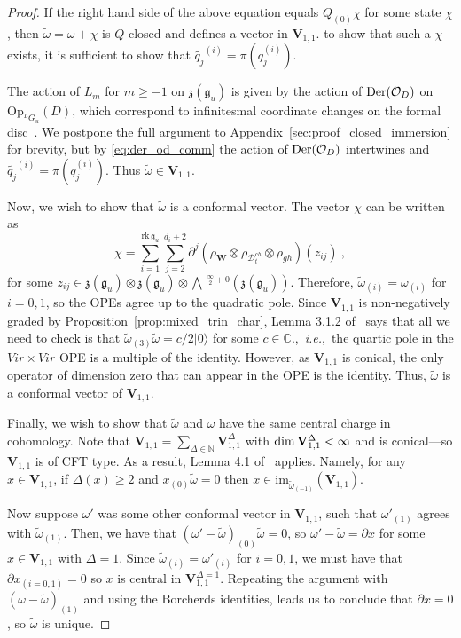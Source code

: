 \documentclass[a4paper]{article}
\def\IC{\mathbb{C}}
\def\IN{\mathbb{N}}
\def\OO{{\cal O}}
\newcommand{\ket}[1]{|{#1}\rangle}
\def\dim{{\rm dim}}
\def\gf{\mathfrak{g}}
\def \zf{\mathfrak{z}}
\def \ie{{\it i.e.}}
\newcommand{\Li}[1]{\mathrm{\bigwedge}\,^{\frac{\infty}{2}+#1}}
\def\D{\mathcal{D}^{ch}}
\def\W{\mathbf{W}}
\def\V{\mathbf{V}}
\begin{document}
\begin{proof}
If the right hand side of the above equation equals $Q_{(0)}\chi$ for some state $\chi$, then $\widetilde{\omega} = \omega + \chi$ is $Q$-closed and defines a vector in $\V_{1,1}$. to show that such a $\chi$ exists, it is sufficient to show that $\widetilde{q_j}^{(i)}= \pi(q_j^{(i)})$.

The action of $L_m$ for $m\geqslant -1$ on $\zf(\gf_u)$ is given by the action of $\mathrm{Der}(\OO_D)$ on $\mathrm{Op}_{^LG_u}(D)$, which correspond to infinitesmal coordinate changes on the formal disc~\cite{Frenkel:2007}. We postpone the full argument to Appendix~\ref{sec:proof_closed_immersion} for brevity, but by \eqref{eq:der_od_comm} the action of $\mathrm{Der}(\OO_D)$ intertwines and $\widetilde{q_j}^{(i)}= \pi(q_j^{(i)})$. Thus $\widetilde{\omega}\in \V_{1,1}$.

Now, we wish to show that $\widetilde{\omega}$ is a conformal vector. The vector $\chi$ can be written as
\begin{equation*}
	\chi = \sum_{i=1}^{\mathrm{rk}\, \gf_u}\sum_{j=2}^{d_i+2} \partial^j (\rho_{\W}\otimes \rho_{\D_t}\otimes \rho_{gh})(z_{ij})~,
\end{equation*}
for some $z_{ij} \in \zf(\gf_u)\otimes\zf(\gf_u)\otimes \Li{0}(\zf(\gf_u))$. Therefore, $\widetilde{\omega}_{(i)}=\omega_{(i)}$ for $i=0,1$, so the OPEs agree up to the quadratic pole. Since $\V_{1,1}$ is non-negatively graded by Proposition~\ref{prop:mixed_trin_char}, Lemma 3.1.2 of~\cite{Frenkel:2007} says that all we need to check is that $\widetilde{\omega}_{(3)}\widetilde{\omega}= c/2\ket{0}$ for some $c\in\IC$.,~\ie,~the quartic pole in the $Vir\times Vir$ OPE is a multiple of the identity. However, as $\V_{1,1}$ is conical, the only operator of dimension zero that can appear in the OPE is the identity. Thus, $\widetilde{\omega}$ is a conformal vector of $\V_{1,1}$.

Finally, we wish to show that $\widetilde{\omega}$ and $\omega$ have the same central charge in cohomology. Note that $\V_{1,1}=\sum_{\Delta\in\IN} \V_{1,1}^{\Delta}$ with $\dim\, \V_{1,1}^\Delta<\infty$ and is conical---so $\V_{1,1}$ is of CFT type. As a result, Lemma 4.1 of~\cite{Moriwaki_2020} applies. Namely, for any $x\in \V_{1,1}$, if $\Delta(x)\geqslant 2$ and $x_{(0)}\widetilde{\omega}=0$ then $x \in \mathrm{im}_{\widetilde{\omega}_{(-1)}}(\V_{1,1})$.

Now suppose $\omega'$ was some other conformal vector in $\V_{1,1}$, such that $\omega'_{(1)}$ agrees with $\widetilde{\omega}_{(1)}$. Then, we have that $(\omega'-\widetilde{\omega})_{(0)}\widetilde{\omega}=0$, so $\omega'-\widetilde{\omega} = \partial x$ for some $x\in\V_{1,1}$ with $\Delta=1$. Since $\widetilde{\omega}_{(i)}=\omega'_{(i)}$ for $i=0,1$, we must have that $\partial x_{(i=0,1)}=0$ so $x$ is central in $\V_{1,1}^{\Delta=1}$. Repeating the argument with $(\omega-\widetilde{\omega})_{(1)}$ and using the Borcherds identities, leads us to conclude that $\partial x =0$, so $\widetilde{\omega}$ is unique.


\end{proof}
\end{document}
